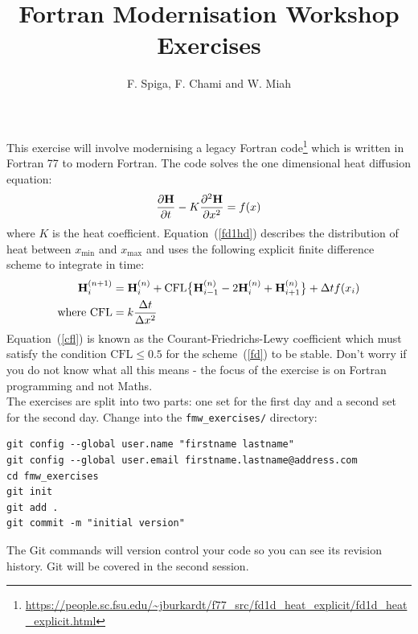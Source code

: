 \documentclass[12pt]{article}
\begin{document}
 
 
 
\title{\bf Fortran Modernisation Workshop \\ Exercises}
\author{F. Spiga, F. Chami and W. Miah}
 
\maketitle

This exercise will involve modernising a legacy Fortran code\footnote{\url{https://people.sc.fsu.edu/~jburkardt/f77_src/fd1d_heat_explicit/fd1d_heat_explicit.html}} which is written 
in Fortran 77 to modern Fortran. The code solves the one dimensional heat
diffusion equation:
\begin{equation} \label{fd1hd}
\frac{\partial{\bf H}}{\partial t} - K\frac{\partial^{2}{\bf H}}{\partial x^{2}} = f(x)
\end{equation}
where $K$ is the heat coefficient. Equation~(\ref{fd1hd}) describes the distribution of heat 
between $x_{\text{min}}$ and $x_{\text{max}}$ and uses the following explicit finite difference 
scheme to integrate in time:
\begin{align}
{\bf H}^{(n+1)}_{i} & = {\bf H}^{(n)}_{i} + \text{CFL}\big\{{\bf H}^{(n)}_{i-1}-2{\bf H}^{(n)}_{i} +
                      {\bf H}^{(n)}_{i+1}\big\} + \Delta t f(x_{i}) \label{fd} \\
            \text{where CFL} & = k\frac{\Delta t}{\Delta x^{2}} \label{cfl}
\end{align}
Equation~(\ref{cfl}) is known as the Courant-Friedrichs-Lewy coefficient which must satisfy
the condition $\text{CFL} \le 0.5$ for the scheme~(\ref{fd}) to be stable. Don't worry if you do 
not know what all this means - the focus of the exercise is on Fortran programming and not
Maths. \\

The exercises are split into two parts: one set for the first day and a second
set for the second day. Change into the \texttt{fmw\_exercises/} directory:
\begin{verbatim}
git config --global user.name "firstname lastname"
git config --global user.email firstname.lastname@address.com
cd fmw_exercises
git init
git add .
git commit -m "initial version"
\end{verbatim}
The Git commands will version control your code so you can see its revision history. Git will
be covered in the second session. \\
\end{document}
